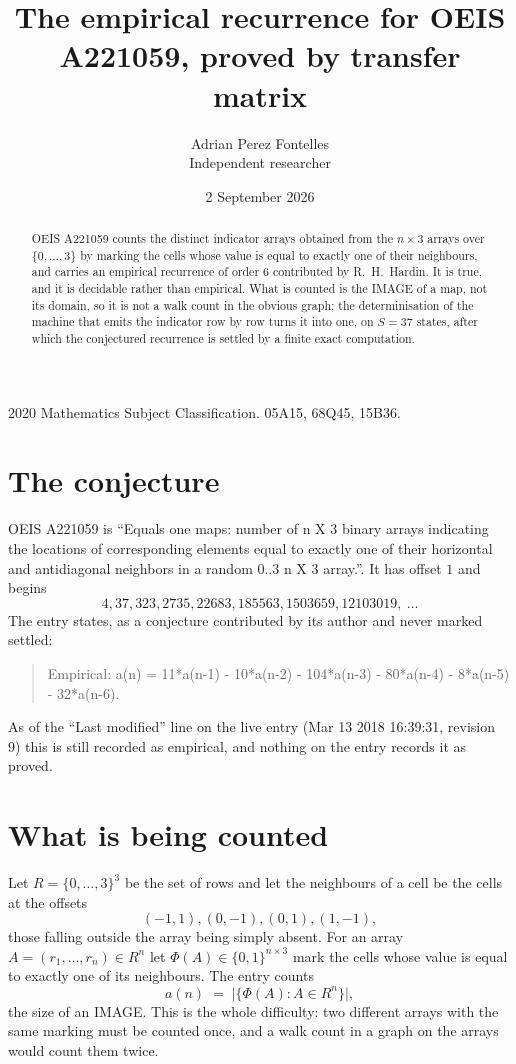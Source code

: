 \documentclass[11pt,a4paper]{article}
\title{The empirical recurrence for OEIS A221059, proved by transfer matrix}
\author{Adrian Perez Fontelles\\ \small Independent researcher}
\date{2 September 2026}
\theoremstyle{plain}
\theoremstyle{definition}
\begin{document}
\maketitle

\begin{abstract}
OEIS A221059 counts the distinct indicator arrays obtained from the $n\times3$ arrays over
$\{0,\dots,3\}$ by marking the cells whose value is equal to exactly one of their neighbours, and carries an
empirical recurrence of order $6$ contributed by R.~H.~Hardin. It is true, and it is
decidable rather than empirical. What is counted is the IMAGE of a map, not its domain, so it
is not a walk count in the obvious graph; the determinisation of the machine that emits the
indicator row by row turns it into one, on $S=37$ states, after which the conjectured
recurrence is settled by a finite exact computation.
\end{abstract}

\noindent\small 2020 Mathematics Subject Classification. 05A15, 68Q45, 15B36.\normalsize

\section{The conjecture}

OEIS A221059 is ``Equals one maps: number of n X 3 binary arrays indicating the locations of corresponding elements equal to exactly one of their horizontal and antidiagonal neighbors in a random 0..3 n X 3 array.''. It has offset $1$ and begins
\[
4, 37, 323, 2735, 22683, 185563, 1503659, 12103019,\ \dots
\]
The entry states, as a conjecture contributed by its author and never marked settled:
\begin{quote}
Empirical: a(n) = 11*a(n-1) - 10*a(n-2) - 104*a(n-3) - 80*a(n-4) - 8*a(n-5) - 32*a(n-6).
\end{quote}
As of the ``Last modified'' line on the live entry (Mar 13 2018 16:39:31, revision 9) this is still
recorded as empirical, and nothing on the entry records it as proved.

\section{What is being counted}

Let $R=\{0,\dots,3\}^{3}$ be the set of rows and let the neighbours of a cell be the
cells at the offsets
\[
(-1,1), (0,-1), (0,1), (1,-1),
\]
those falling outside the array being simply absent. For an array
$A=(r_1,\dots,r_n)\in R^n$ let $\Phi(A)\in\{0,1\}^{n\times3}$ mark the cells whose value
is equal to exactly one of its neighbours. The entry counts
\[
a(n)\;=\;\bigl|\{\Phi(A):A\in R^n\}\bigr| ,
\]
the size of an IMAGE. This is the whole difficulty: two different arrays with the same marking
must be counted once, and a walk count in a graph on the arrays would count them twice.
\end{document}
